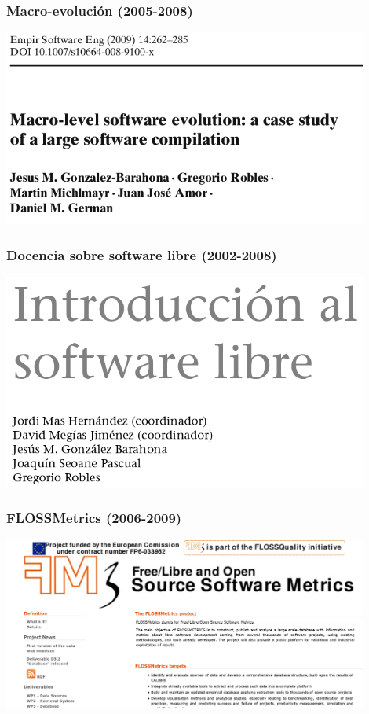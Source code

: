 \begin{frame}[fragile]
  \frametitle{Macro-evolución (2005-2008)}

  \begin{center}
  \includegraphics[width=12cm]{figs/macro-evolution}
  \end{center}  
  
\end{frame}

\begin{frame}[fragile]
  \frametitle{Docencia sobre software libre (2002-2008)}

  \begin{center}
  \includegraphics[width=12cm]{figs/intro-sobre}
  \end{center}  
  
\end{frame}

\begin{frame}[fragile]
  \frametitle{FLOSSMetrics (2006-2009)}

  \begin{center}
  \includegraphics[width=12cm]{figs/flossmetrics}
  \end{center}  
  
\end{frame}

